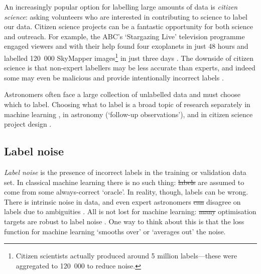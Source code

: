 \documentclass[11pt, a4paper]{book}
\newcommand{\defn}[1]{\emph{#1}}
\providecommand{\DIFaddtex}[1]{{\protect\color{blue}\uwave{#1}}} %
\providecommand{\DIFdeltex}[1]{{\protect\color{red}\sout{#1}}}                      %
\providecommand{\DIFaddbegin}{} %
\providecommand{\DIFaddend}{} %
\providecommand{\DIFdelbegin}{} %
\providecommand{\DIFdelend}{} %
\providecommand{\DIFadd}[1]{\texorpdfstring{\DIFaddtex{#1}}{#1}} %
\providecommand{\DIFdel}[1]{\texorpdfstring{\DIFdeltex{#1}}{}} %
\newcommand{\DIFscaledelfig}{0.5}
\newlength{\DIFdelgraphicswidth} %
\newlength{\DIFdelgraphicsheight} %
\newcommand{\DIFaddincludegraphics}[2][]{{\color{blue}\fbox{\DIFOincludegraphics[#1]{#2}}}} %
\newcommand{\DIFdelincludegraphics}[2][]{%
\sbox{\DIFdelgraphicsbox}{\DIFOincludegraphics[#1]{#2}}%
\settoboxwidth{\DIFdelgraphicswidth}{\DIFdelgraphicsbox} %
\settoboxtotalheight{\DIFdelgraphicsheight}{\DIFdelgraphicsbox} %
\scalebox{\DIFscaledelfig}{%
\parbox[b]{\DIFdelgraphicswidth}{\usebox{\DIFdelgraphicsbox}\\[-\baselineskip] \rule{\DIFdelgraphicswidth}{0em}}\llap{\resizebox{\DIFdelgraphicswidth}{\DIFdelgraphicsheight}{%
\setlength{\unitlength}{\DIFdelgraphicswidth}%
\begin{picture}(1,1)%
\thicklines\linethickness{2pt} %
{\color[rgb]{1,0,0}\put(0,0){\framebox(1,1){}}}%
{\color[rgb]{1,0,0}\put(0,0){\line( 1,1){1}}}%
{\color[rgb]{1,0,0}\put(0,1){\line(1,-1){1}}}%
\end{picture}%
}\hspace*{3pt}}} %
} %
\DeclareRobustCommand{\DIFaddbegin}{\DIFOaddbegin \let\includegraphics\DIFaddincludegraphics} %
\DeclareRobustCommand{\DIFaddend}{\DIFOaddend \let\includegraphics\DIFOincludegraphics} %
\DeclareRobustCommand{\DIFdelbegin}{\DIFOdelbegin \let\includegraphics\DIFdelincludegraphics} %
\DeclareRobustCommand{\DIFdelend}{\DIFOaddend \let\includegraphics\DIFOincludegraphics} %
\begin{document}
        An increasingly popular option for labelling large amounts of data is \defn{citizen science}: asking volunteers who are interested in contributing to science to label our data. Citizen science projects can be a fantastic opportunity for both science and outreach. For example, the ABC's `Stargazing Live' television programme engaged viewers and with their help found four exoplanets in just 48 hours \citep{miller_stargazing_2017} and labelled 120~000 SkyMapper images\footnote{Citizen scientists actually produced around 5 million labels---these were aggregated to 120~000 to reduce noise.} in just three days \citep{tucker_stargazing_2017}. The downside of citizen science is that non-expert labellers may be less accurate than experts, and indeed some may even be malicious and provide intentionally incorrect labels \citep{zhang_learning_2016}.

        Astronomers often face a large collection of unlabelled data and must choose which to label. Choosing what to label is a broad topic of research separately in machine learning \citep[often called active learning e.g.][]{gilyazev_active_2018}, in astronomy (`follow-up observations'), and in citizen science project design \citep[e.g. citizen science project Snapshot Serengeti found that showing volunteers \emph{uninteresting} images helped retain engagement;][]{sieland_snapshot_2015}.

    \subsection{Label noise}
    \label{sec:label-noise}

        \defn{Label noise} is the presence of incorrect labels in the training or validation data set. In classical machine learning there is no such thing: \DIFdelbegin \DIFdel{labels }\DIFdelend \DIFaddbegin \DIFadd{Labels }\DIFaddend are assumed to come from some always-correct `oracle'. In reality, though, labels can be wrong. There is intrinsic noise in data, and even expert astronomers \DIFdelbegin \DIFdel{can }\DIFdelend \DIFaddbegin \DIFadd{may }\DIFaddend disagree on labels due to ambiguities \citep[e.g. around 10 per cent of Radio Galaxy Zoo is extremely divisive amongst expert labellers;][]{banfield15}. All is not lost for machine learning: \DIFdelbegin \DIFdel{many }\DIFdelend \DIFaddbegin \DIFadd{Many }\DIFaddend optimisation targets are robust to label noise \citep{menon15cpe}. One way to think about this is that the loss function for machine learning `smooths over' or `averages out' the noise.
\end{document}

